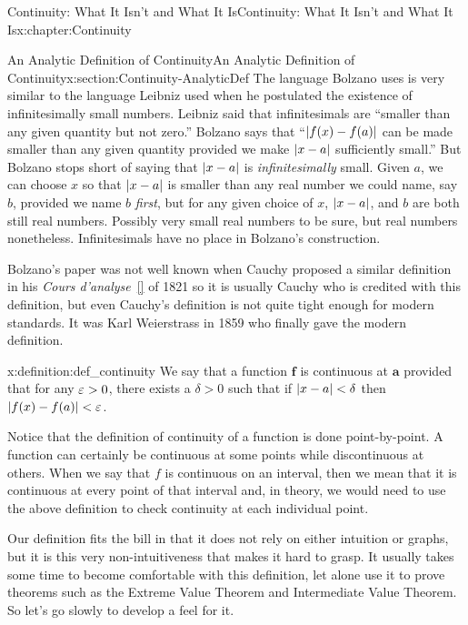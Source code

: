 \begin{chapterptx}{Continuity: What It Isn't and What It Is}{}{Continuity: What It Isn't and What It Is}{}{}{x:chapter:Continuity}
\begin{sectionptx}{An Analytic Definition of Continuity}{}{An Analytic Definition of Continuity}{}{}{x:section:Continuity-AnalyticDef}
		The language Bolzano uses is very similar to the language Leibniz  used when he postulated the existence of infinitesimally small numbers. Leibniz said that infinitesimals are ``smaller than any given quantity but not zero.'' Bolzano says that ``\(\left|f(x)-f(a)\right|\) can be made smaller than any given quantity provided we make \(\left|x-a\right|\) sufficiently small.'' But Bolzano stops short of saying that \(\left|x-a\right|\) is \emph{infinitesimally} small.  Given \(a\), we can choose \(x\) so that \(\left|x-a\right|\) is smaller than any real number we could name, say \(b\), provided we name \(b\) \emph{first}, but for any given choice of \(x\), \(\left|x-a\right|\), and \(b\) are both still real numbers.  Possibly very small real numbers to be sure, but real numbers nonetheless.  Infinitesimals have no place in Bolzano's construction.%
		\par
		 Bolzano's paper was not well known when Cauchy  proposed a similar definition in his \emph{Cours d'analyse}~\hyperlink{x:biblio:bradley09__cauch_cours}{[{}]} of 1821 so it is usually Cauchy who is credited with this definition, but even Cauchy's definition is not quite tight enough for modern standards.  It was Karl Weierstrass in 1859 who finally gave the modern definition.%
		\begin{definition}{}{x:definition:def_continuity}%
			 We say that a function \(\boldsymbol{f}\) is continuous at \(\boldsymbol{a}\) provided that for any \(\varepsilon>0\), there exists a \(\delta>0\) such that if \(\left|x-a\right|<
			\delta\) then \(|f(x)-f(a)|< \varepsilon\).%
		\end{definition}
		Notice that the definition of continuity of a function is done point-by-point.  A function can certainly be continuous at some points while discontinuous at others.  When we say that \(f\) is continuous on an interval, then we mean that it is continuous at every point of that interval and, in theory, we would need to use the above definition to check continuity at each individual point.%
		\par
		 Our definition fits the bill in that it does not rely on either intuition or graphs, but it is this very non-intuitiveness that makes it hard to grasp.  It usually takes some time to become comfortable with this definition, let alone use it to prove theorems such as the Extreme Value Theorem and Intermediate Value Theorem.  So let's go slowly to develop a feel for it.%

\end{sectionptx}
\end{chapterptx}
